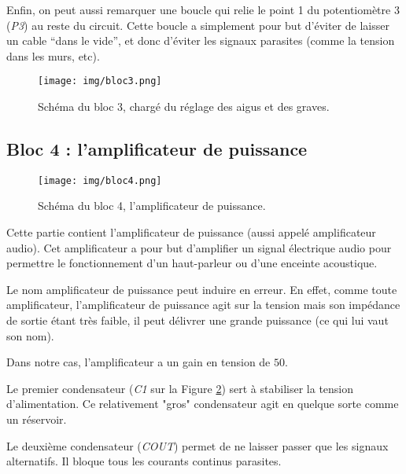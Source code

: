 Enfin, on peut aussi remarquer une boucle qui relie le point 1 du potentiomètre 3 (\textit{P3}) au reste du circuit. Cette boucle a simplement pour but d'éviter de laisser un cable "`dans le vide"', et donc d'éviter les signaux parasites (comme la tension dans les murs, etc).

\begin{figure}[h]
	\centering
	\texttt{[image: img/bloc3.png]}
	\caption{Schéma du bloc 3, chargé du réglage des aigus et des graves.}
	\label{bloc3}
\end{figure}

\subsection{Bloc 4 : l'amplificateur de puissance}

\begin{figure}[h]
	\centering
	\texttt{[image: img/bloc4.png]}
	\caption{Schéma du bloc 4, l'amplificateur de puissance.}
	\label{bloc4}
\end{figure}

Cette partie contient l'amplificateur de puissance (aussi appelé amplificateur audio). 
Cet amplificateur a pour but d'amplifier un signal électrique audio pour
permettre le fonctionnement d'un haut-parleur ou d'une enceinte acoustique.

Le nom amplificateur de puissance peut induire en erreur. En effet, comme toute amplificateur,
l'amplificateur de puissance agit sur la tension mais son impédance de sortie étant très faible,
il peut délivrer une grande puissance (ce qui lui vaut son nom).

Dans notre cas, l'amplificateur a un gain en tension de $50$.

Le premier condensateur (\textit{C1} sur la Figure \ref{bloc4}) sert à stabiliser la tension d'alimentation. Ce relativement "gros" condensateur
agit en quelque sorte comme un réservoir.

Le deuxième condensateur (\textit{COUT}) permet de ne laisser passer que les signaux alternatifs. Il bloque tous les courants continus parasites.


